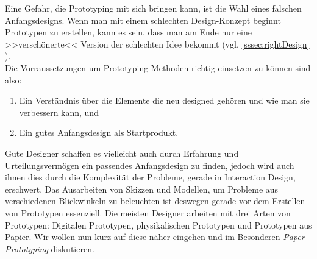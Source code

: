 Eine Gefahr, die Prototyping mit sich bringen kann, ist die Wahl eines falschen Anfangsdesigns. Wenn man mit einem schlechten Design-Konzept beginnt Prototypen zu erstellen, kann es sein, dass man am Ende nur eine >>verschönerte<< Version der schlechten Idee bekommt (vgl. \ref{sssec:rightDesign} ).\\ Die Vorraussetzungen um Prototyping Methoden richtig einsetzen zu können sind also:

\begin{enumerate}
	\item Ein Verständnis über die Elemente die neu designed gehören und wie man sie verbessern kann, und
	\item Ein gutes Anfangsdesign als Startprodukt.
\end{enumerate}
\begin{flushright}\citep{Dix:2004}\end{flushright}

Gute Designer schaffen es vielleicht auch durch Erfahrung und Urteilungsvermögen ein passendes Anfangsdesign zu finden, jedoch wird auch ihnen dies durch die Komplexität der Probleme, gerade in Interaction Design, erschwert. Das Ausarbeiten von Skizzen und Modellen, um Probleme aus verschiedenen Blickwinkeln zu beleuchten ist deswegen gerade vor dem Erstellen von Prototypen essenziell.
Die meisten Designer arbeiten mit drei Arten von Prototypen: Digitalen Prototypen, physikalischen Prototypen und Prototypen aus Papier. Wir wollen nun kurz auf diese näher eingehen und im Besonderen \emph{Paper Prototyping} diskutieren. 

